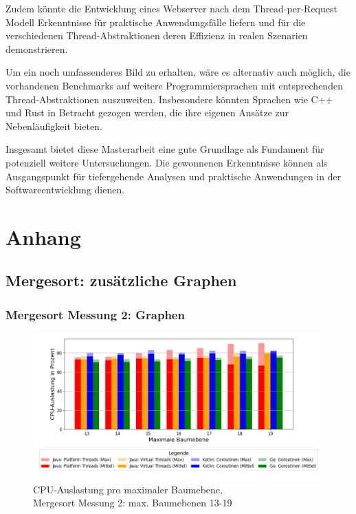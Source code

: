 \documentclass[fontsize=12pt,paper=a4,twoside=semi,parskip=half-,headsepline,headinclude]{scrreprt}
\begin{document}
Zudem könnte die Entwicklung eines Webserver nach dem Thread-per-Request Modell Erkenntnisse für praktische Anwendungsfälle liefern und für die verschiedenen Thread-Abstraktionen deren Effizienz in realen Szenarien demonstrieren.

Um ein noch umfassenderes Bild zu erhalten, wäre es alternativ auch möglich, die vorhandenen Benchmarks auf weitere Programmiersprachen mit entsprechenden Thread-Abstraktionen auszuweiten. Insbesondere könnten Sprachen wie C++ und Rust in Betracht gezogen werden, die ihre eigenen Ansätze zur Nebenläufigkeit bieten.

Insgesamt bietet diese Masterarbeit eine gute Grundlage als Fundament für potenziell weitere Untersuchungen. Die gewonnenen Erkenntnisse können als Ausgangspunkt für tiefergehende Analysen und praktische Anwendungen in der Softwareentwicklung dienen.


\printbibliography


\chapter{Anhang}

\section{Mergesort: zusätzliche Graphen}

\subsection{Mergesort Messung 2: Graphen}

\begin{figure}[H]
	\centering
	\includegraphics[scale=0.5]{figures/mergesort/Maximalebauebenen1-19_pvcg/cpu_usage_bar_plot.png}
	\caption{CPU-Auslastung pro maximaler Baumebene,\\ Mergesort Messung 2: max. Baumebenen 13-19}
	\label{fig:ms1-19CPU}
\end{figure}
\end{document}
